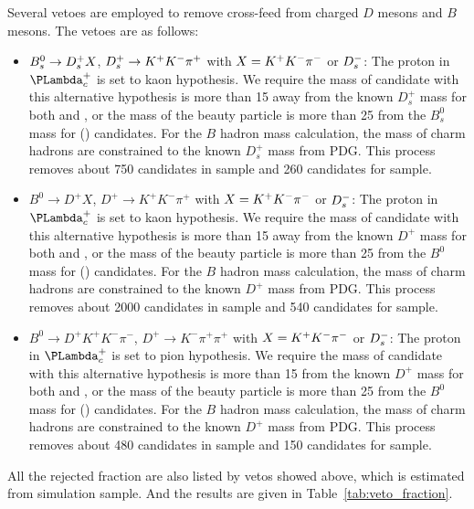 Several vetoes are employed to remove cross-feed from charged $D$ mesons and $B$ mesons. 
The vetoes are as follows:
 \begin{itemize}
 \item $B^0_s \rightarrow {\ensuremath{{D}^+_{s}}} X$, ${{D}^+_{s}} \rightarrow K^+ K^- \pi^+$ with $X= {{K}^+} {{K}^-} \pi^-$ or ${{D}^-_{s}}$: 
 The proton in $\Lc$ is set to kaon hypothesis. 
 We require the mass of \Lc candidate with this alternative hypothesis is more than 15 \mevcc away from the known $D_s^+$ mass for both \LbLckkpi and \LbLcDs, 
 or the mass of the beauty particle is more than 25 \mevcc from the $B^0_s$ mass for \LbLckkpi(\LbLcDs) candidates. 
 For the $B$ hadron mass calculation, 
 the mass of charm hadrons are constrained to the known $D_s^+$ mass from PDG. 
 This process removes about 750 candidates in \LbLckkpi sample and 260 candidates for \LbLcDs sample.  
 \item $B^0 \to D^+ X$, $D^+ \to K^+ K^- \pi^+$ with $X= {{K}^+} {{K}^-} \pi^-$ or ${{D}^-_{s}}$: 
 The proton in $\Lc$ is set to kaon hypothesis. 
 We require the mass of \Lc candidate with this alternative hypothesis is more than 15 \mevcc away from the known $D^+$ mass for both \LbLckkpi and \LbLcDs, 
 or the mass of the beauty particle is more than 25 \mevcc from the $B^0$ mass for \LbLckkpi(\LbLcDs) candidates. 
 For the $B$ hadron mass calculation, 
 the mass of charm hadrons are constrained to the known $D^+$ mass from PDG. 
 This process removes about 2000 candidates in \LbLckkpi sample and 540 candidates for \LbLcDs sample. 
  \item $B^0 \to D^+ K^+ K^- \pi^-$, $D^+ \to K^- \pi^+ \pi^+$ with $X= {{K}^+} {{K}^-} \pi^-$ or ${{D}^-_{s}}$: 
  The proton in $\Lc$ is set to pion hypothesis. 
  We require the mass of \Lc candidate with this alternative hypothesis is more than 15 \mevcc from the known $D^+$ mass for both \LbLckkpi and \LbLcDs, 
  or the mass of the beauty particle is more than 25 \mevcc from the $B^0$ mass for \LbLckkpi(\LbLcDs) candidates. 
  For the $B$ hadron  mass calculation, 
  the mass of charm hadrons are constrained to the known $D^+$ mass from PDG. 
  This process removes about 480 candidates in \LbLckkpi sample and 150 candidates for \LbLcDs sample. 
\end{itemize}

All the rejected fraction are also listed by vetos showed above, 
which is estimated from simulation sample. 
And the results are given in Table~\ref{tab:veto_fraction}. 


